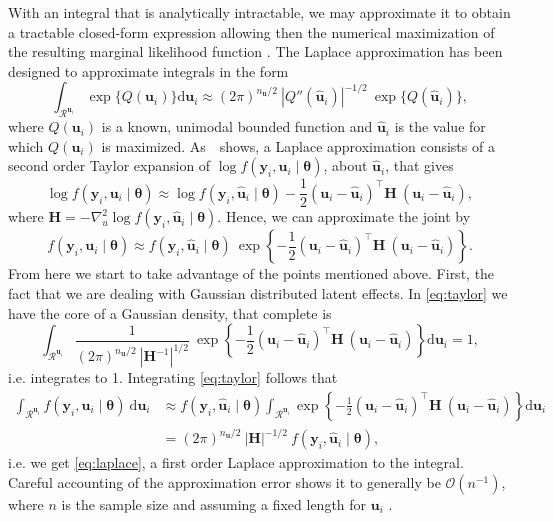 With an integral that is analytically intractable, we may approximate it
to obtain a tractable closed-form expression allowing then the numerical
maximization of the resulting marginal likelihood function
\cite{patrao}. The Laplace approximation has been designed to
approximate integrals in the form
\begin{equation}
  \int_{\mathcal{R}^{\mathbf{u}_{i}}}
  \exp\{Q(\mathbf{u}_{i})\} \text{d} \mathbf{u}_{i}\approx
  (2\pi)^{n_{\mathbf{u}}/2}~
  |{Q}''(\mathbf{\hat{u}}_{i})|^{-1/2}~\exp\{Q(\mathbf{\hat{u}}_{i})\},
  \label{eq:laplace}
\end{equation}
where \(Q(\mathbf{u}_{i})\) is a known, unimodal bounded function and
\(\mathbf{\hat{u}}_{i}\) is the value for which \(Q(\mathbf{u}_{i})\) is
maximized. As~~shows, a Laplace approximation
consists of a second order Taylor expansion of \(\log f(\mathbf{y}_{i},
\mathbf{u}_{i} \mid \bm{\theta})\), about \(\mathbf{\hat{u}}_{i}\), that
gives
\[
  \log f(\mathbf{y}_{i}, \mathbf{u}_{i} \mid \bm{\theta})\approx
  \log f(\mathbf{y}_{i}, \mathbf{\hat{u}}_{i} \mid \bm{\theta}) -
  \frac{1}{2}
  (\mathbf{u}_{i} - \mathbf{\hat{u}}_{i})^{\top}\mathbf{H}~
  (\mathbf{u}_{i} - \mathbf{\hat{u}}_{i}),
\]
where \(\mathbf{H} = - \nabla_{u}^{2} \log f(\mathbf{y}_{i},
\mathbf{\hat{u}}_{i} \mid \bm{\theta})\). Hence, we can approximate the
joint by
\begin{equation}
  f(\mathbf{y}_{i}, \mathbf{u}_{i} \mid \bm{\theta})\approx
  f(\mathbf{y}_{i}, \mathbf{\hat{u}}_{i} \mid \bm{\theta})~\exp
  \left\{- \frac{1}{2}
    (\mathbf{u}_{i} - \mathbf{\hat{u}}_{i})^{\top}\mathbf{H}~
    (\mathbf{u}_{i} - \mathbf{\hat{u}}_{i})
  \right\}.
  \label{eq:taylor}
\end{equation}
From here we start to take advantage of the points mentioned above.
First, the fact that we are dealing with Gaussian distributed latent
effects. In \autoref{eq:taylor} we have the core of a Gaussian density,
that complete is
\[
  \int_{\mathcal{R}^{\mathbf{u}_{i}}}
  \frac{1}{(2\pi)^{n_{\mathbf{u}}/2}~|\mathbf{H}^{-1}|^{1/2}}~\exp
  \left\{- \frac{1}{2}
    (\mathbf{u}_{i} - \mathbf{\hat{u}}_{i})^{\top}\mathbf{H}~
    (\mathbf{u}_{i} - \mathbf{\hat{u}}_{i})
  \right\} \text{d}\mathbf{u}_{i} = 1,
\]
i.e. integrates to 1. Integrating \autoref{eq:taylor} follows that
\begin{align*}
  \int_{\mathcal{R}^{\mathbf{u}_{i}}}
  f(\mathbf{y}_{i}, \mathbf{u}_{i} \mid \bm{\theta})
  ~\text{d}\mathbf{u}_{i}
  &\approx f(\mathbf{y}_{i}, \mathbf{\hat{u}}_{i} \mid \bm{\theta})
    \int_{\mathcal{R}^{\mathbf{u}_{i}}} \exp
    \left\{- \frac{1}{2}
    (\mathbf{u}_{i} - \mathbf{\hat{u}}_{i})^{\top}\mathbf{H}~
    (\mathbf{u}_{i} - \mathbf{\hat{u}}_{i})
    \right\} \text{d}\mathbf{u}_{i}\\
  &= (2\pi)^{n_{\mathbf{u}}/2}~|\mathbf{H}|^{-1/2}~
    f(\mathbf{y}_{i}, \mathbf{\hat{u}}_{i} \mid \bm{\theta}),
\end{align*}
i.e. we get \autoref{eq:laplace}, a first order Laplace approximation to
the integral. Careful accounting of the approximation error shows it to
generally be \(\mathcal{O}(n^{-1})\), where \(n\) is the sample size and
assuming a fixed length for \(\mathbf{u}_{i}\) \cite{corestats}.

